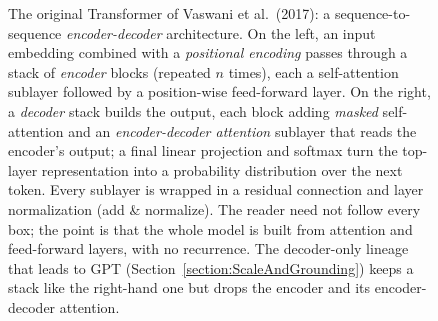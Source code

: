 \begin{figure}[t]
\centering

\caption{The original Transformer of Vaswani et al.\ (2017): a sequence-to-sequence \emph{encoder-decoder} architecture.
On the left, an input embedding combined with a \emph{positional encoding} passes through a stack of \emph{encoder} blocks (repeated $n$ times), each a self-attention sublayer followed by a position-wise feed-forward layer.
On the right, a \emph{decoder} stack builds the output, each block adding \emph{masked} self-attention and an \emph{encoder-decoder attention} sublayer that reads the encoder's output; a final linear projection and softmax turn the top-layer representation into a probability distribution over the next token.
Every sublayer is wrapped in a residual connection and layer normalization (add \& normalize).
The reader need not follow every box; the point is that the whole model is built from attention and feed-forward layers, with no recurrence.
The decoder-only lineage that leads to GPT (Section~\ref{section:ScaleAndGrounding}) keeps a stack like the right-hand one but drops the encoder and its encoder-decoder attention.}
\label{figure:Transformer}
\end{figure}

